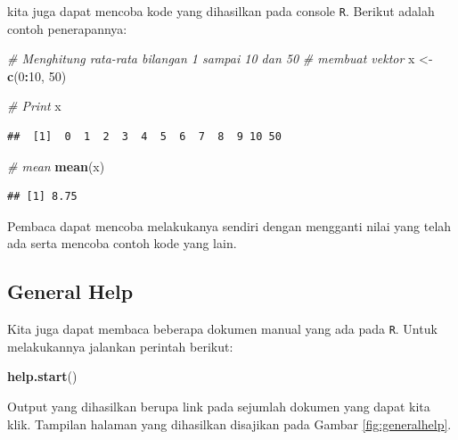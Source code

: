 \documentclass[]{book}
\newenvironment{Shaded}{\begin{snugshade}}{\end{snugshade}}
\newcommand{\CommentTok}[1]{\textcolor[rgb]{0.56,0.35,0.01}{\textit{#1}}}
\newcommand{\DecValTok}[1]{\textcolor[rgb]{0.00,0.00,0.81}{#1}}
\newcommand{\KeywordTok}[1]{\textcolor[rgb]{0.13,0.29,0.53}{\textbf{#1}}}
\newcommand{\NormalTok}[1]{#1}
\newcommand{\OperatorTok}[1]{\textcolor[rgb]{0.81,0.36,0.00}{\textbf{#1}}}
\newcommand{\StringTok}[1]{\textcolor[rgb]{0.31,0.60,0.02}{#1}}
\theoremstyle{definition}
\theoremstyle{definition}
\theoremstyle{definition}
\theoremstyle{remark}
\begin{document}
kita juga dapat mencoba kode yang dihasilkan pada console \texttt{R}. Berikut adalah contoh penerapannya:

\begin{Shaded}
\begin{Highlighting}[]
\CommentTok{# Menghitung rata-rata bilangan 1 sampai 10 dan 50}
\CommentTok{# membuat vektor}
\NormalTok{x <-}\StringTok{ }\KeywordTok{c}\NormalTok{(}\DecValTok{0}\OperatorTok{:}\DecValTok{10}\NormalTok{, }\DecValTok{50}\NormalTok{)}

\CommentTok{# Print}
\NormalTok{x}
\end{Highlighting}
\end{Shaded}

\begin{verbatim}
##  [1]  0  1  2  3  4  5  6  7  8  9 10 50
\end{verbatim}

\begin{Shaded}
\begin{Highlighting}[]
\CommentTok{# mean}
\KeywordTok{mean}\NormalTok{(x)}
\end{Highlighting}
\end{Shaded}

\begin{verbatim}
## [1] 8.75
\end{verbatim}

Pembaca dapat mencoba melakukanya sendiri dengan mengganti nilai yang telah ada serta mencoba contoh kode yang lain.

\hypertarget{generalhelp}{%
\subsection{General Help}\label{generalhelp}}

Kita juga dapat membaca beberapa dokumen manual yang ada pada \texttt{R}. Untuk melakukannya jalankan perintah berikut:

\begin{Shaded}
\begin{Highlighting}[]
\KeywordTok{help.start}\NormalTok{()}
\end{Highlighting}
\end{Shaded}

Output yang dihasilkan berupa link pada sejumlah dokumen yang dapat kita klik. Tampilan halaman yang dihasilkan disajikan pada Gambar \ref{fig:generalhelp}.
\end{document}
